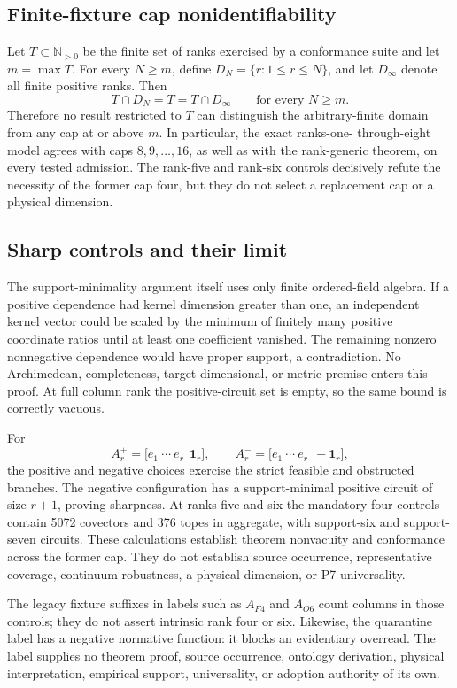 \documentclass[11pt]{article}
\begin{document}
\subsection{Finite-fixture cap nonidentifiability}

Let $T\subset\mathbb{N}_{>0}$ be the finite set of ranks exercised by a
conformance suite and let $m=\max T$.  For every $N\ge m$, define
$D_N=\{r:1\le r\le N\}$, and let $D_\infty$ denote all finite positive
ranks.  Then
\[
 T\cap D_N=T=T\cap D_\infty
 \qquad\text{for every }N\ge m.
\]
Therefore no result restricted to $T$ can distinguish the arbitrary-finite
domain from any cap at or above $m$.  In particular, the exact ranks-one-
through-eight model agrees with caps $8,9,\ldots,16$, as well as with the
rank-generic theorem, on every tested admission.  The rank-five and rank-six
controls decisively refute the necessity of the former cap four, but they do
not select a replacement cap or a physical dimension.

\subsection{Sharp controls and their limit}

The support-minimality argument itself uses only finite ordered-field
algebra.  If a positive dependence had kernel dimension greater than one,
an independent kernel vector could be scaled by the minimum of finitely many
positive coordinate ratios until at least one coefficient vanished.  The
remaining nonzero nonnegative dependence would have proper support, a
contradiction.  No Archimedean, completeness, target-dimensional, or
metric premise enters this proof.  At full column rank the positive-circuit
set is empty, so the same bound is correctly vacuous.

For
\[
 A_r^+=\bigl[e_1\ \cdots\ e_r\ \ \mathbf{1}_r\bigr],\qquad
 A_r^-=\bigl[e_1\ \cdots\ e_r\ \ -\mathbf{1}_r\bigr],
\]
the positive and negative choices exercise the strict feasible and obstructed
branches.  The negative configuration has a support-minimal positive circuit
of size $r+1$, proving sharpness.  At ranks five and six the mandatory four
controls contain 5072 covectors and 376 topes in aggregate, with support-six
and support-seven circuits.  These calculations establish theorem
nonvacuity and conformance across the former cap.  They do not establish
source occurrence, representative coverage, continuum robustness, a physical
dimension, or P7 universality.

The legacy fixture suffixes in labels such as $A_{F4}$ and $A_{O6}$ count
columns in those controls; they do not assert intrinsic rank four or six.
Likewise, the quarantine label has a negative normative function: it blocks
an evidentiary overread.  The label supplies no theorem proof, source
occurrence, ontology derivation, physical interpretation, empirical support,
universality, or adoption authority of its own.
\end{document}
